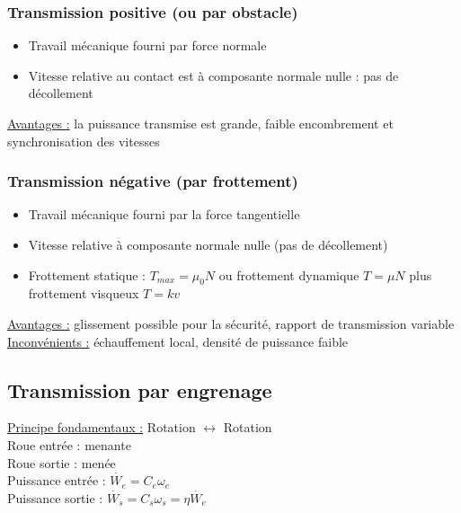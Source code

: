 \documentclass[../main.tex]{subfiles}
\begin{document}
\subsubsection{Transmission positive (ou par obstacle)}
\begin{itemize}
    \item Travail mécanique fourni par force normale\\
    \item Vitesse relative au contact est à composante normale nulle : pas de décollement\\
\end{itemize}

\underline{Avantages :}
la puissance transmise est grande, faible encombrement et synchronisation des vitesses\\

\subsubsection{Transmission négative (par frottement)}
\begin{itemize}
    \item Travail mécanique fourni par la force tangentielle\\
    \item Vitesse relative à composante normale nulle (pas de décollement)\\
    \item Frottement statique  : $T_{max} = \mu_0 N$ ou frottement dynamique $T = \mu N$ plus frottement visqueux $T = kv$\\
\end{itemize}

\underline{Avantages :} glissement possible pour la sécurité, rapport de transmission variable\\

\underline{Inconvénients :} échauffement local, densité de puissance faible\\


\subsection{Transmission par engrenage}
\quad \underline{Principe fondamentaux :} Rotation $\leftrightarrow$ Rotation \\
Roue entrée : menante\\
Roue sortie : menée\\
Puissance entrée : $\dot{W_e} = C_e \omega_e$\\
Puissance sortie : $\dot{W_s} = C_s \omega_s = \eta \dot{W_e}$\\
\end{document}
